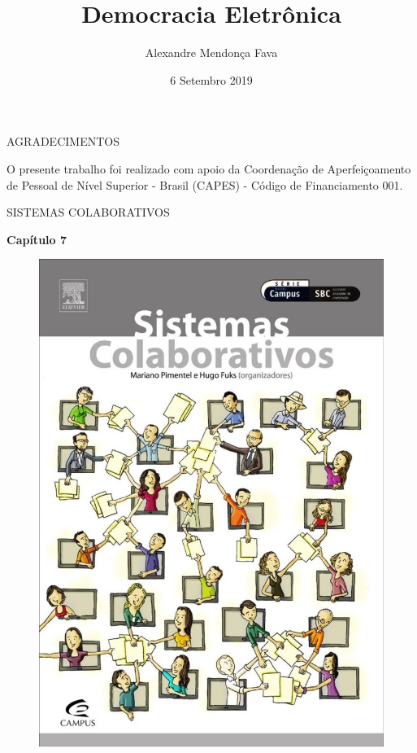 \documentclass{Alexandre}
\title{Democracia Eletrônica}
\author{Alexandre Mendonça Fava\inst{1}}
\institute[UDESC]{
  \newline \newline \newline
  \inst{1}
  Mestrado Acadêmico em Computação Aplicada - PPGCA
}
\date{6 Setembro 2019}
\begin{document}
\begin{frame}
  \titlepage
\end{frame}


\begin{frame}{AGRADECIMENTOS}

    O presente trabalho foi realizado com apoio da Coordenação de Aperfeiçoamento de Pessoal de Nível Superior - Brasil (CAPES) - Código de Financiamento 001. 

\end{frame}


\begin{frame}{SISTEMAS COLABORATIVOS}
    \begin{center}
        \textbf{Capítulo 7}
    \end{center}
    \begin{figure}
        \includegraphics[scale = 0.15]{Figuras/Livro-SistemasColaborativos.jpg}
    \end{figure}

\end{frame}
\end{document}
